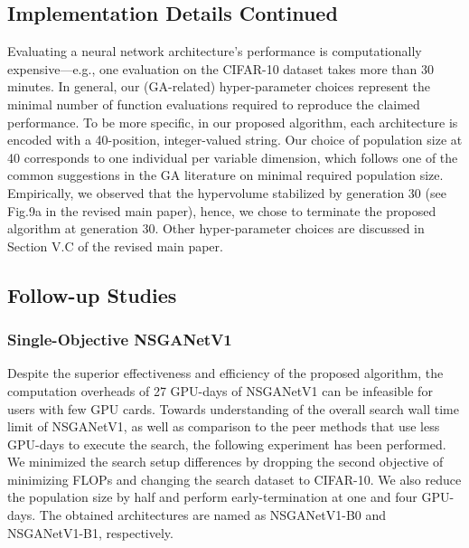 \documentclass[journal]{IEEEtran}
\def\ourmethod{NSGANetV1}
\theoremstyle{definition}
\theoremstyle{remark}
\begin{document}
{
\subsection{Implementation Details Continued\label{sec:supple_train}}
Evaluating a neural network architecture's performance is computationally expensive---e.g., one evaluation on the CIFAR-10 dataset takes more than 30 minutes. In general, our (GA-related) hyper-parameter choices represent the minimal number of function evaluations required to reproduce the claimed performance. To be more specific, in our proposed algorithm, each architecture is encoded with a 40-position, integer-valued string. Our choice of population size at 40 corresponds to one individual per variable dimension, which follows one of the common suggestions in the GA literature on minimal required population size. Empirically, we observed that the hypervolume stabilized by generation 30 (see Fig.9a in the revised main paper), hence, we chose to terminate the proposed algorithm at generation 30. Other hyper-parameter choices are discussed in Section V.C of the revised main paper.}

\subsection{Follow-up Studies\label{sec:utilities}}
\subsubsection{Single-Objective \ourmethod{}}
Despite the superior effectiveness and efficiency of the proposed algorithm, the computation overheads of 27 GPU-days of \ourmethod{} can be infeasible for users with few GPU cards. Towards understanding of the overall search wall time limit of \ourmethod{}, as well as comparison to the peer methods that use less GPU-days to execute the search, the following experiment has been performed. We minimized the search setup differences by dropping the second objective of minimizing FLOPs and changing the search dataset to CIFAR-10. We also reduce the population size by half and perform early-termination at one and four GPU-days. The obtained architectures are named as \ourmethod{}-B0 and \ourmethod{}-B1, respectively.
\end{document}
